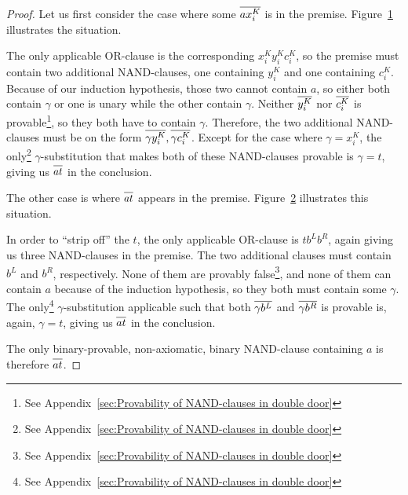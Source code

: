 \begin{proof}
Let us first consider the case where some $\ol{ax^K_i}$ is in the premise.
Figure~\ref{fig:nand_base_case} illustrates the situation.\par
\begin{figure}[!h]
  \centering
  \begin{prooftree*}
    \Hypo{\dots}
    \Hypo{\dots}
  \end{prooftree*}
  \caption{}
  \label{fig:nand_base_case}
\end{figure}
The only applicable OR-clause is the corresponding $x^K_iy^K_ic^K_i$, so the premise must contain two additional NAND-clauses, one containing $y^K_i$ and one containing $c^K_i$.
Because of our induction hypothesis, those two cannot contain $a$, so either both contain $\gamma$ or one is unary while the other contain $\gamma$.
Neither $\ol{y^K_i}$ nor $\ol{c^K_i}$ is provable\footnote{\label{table_reference} See Appendix~\ref{sec:Provability of NAND-clauses in double door}}, so they both have to contain $\gamma$.
Therefore, the two additional NAND-clauses must be on the form $\ol{\gamma y^K_i},\ol{\gamma c^K_i}$.
Except for the case where $\gamma = x^K_i$, the only\footnote{\label{table_reference} See Appendix~\ref{sec:Provability of NAND-clauses in double door}} $\gamma$-substitution that makes both of these NAND-clauses provable is $\gamma = t$, giving us $\ol{at}$ in the conclusion.

The other case is where $\ol{at}$ appears in the premise.
Figure~\ref{fig:nand_inductive_step} illustrates this situation.\par
\begin{figure}[!h]
  \centering
  \begin{prooftree*}
    \Hypo{\dots}
    \Hypo{\dots}
    \Hypo{\dots}
  \end{prooftree*}
  \caption{}
  \label{fig:nand_inductive_step}
\end{figure}
In order to ``strip off'' the $t$, the only applicable OR-clause is $tb^Lb^R$, again giving us three NAND-clauses in the premise.
The two additional clauses must contain $b^L$ and $b^R$, respectively.
None of them are provably false\footnote{\label{table_reference} See Appendix~\ref{sec:Provability of NAND-clauses in double door}}, and none of them can contain $a$ because of the induction hypothesis, so they both must contain some $\gamma$.
The only\footnote{\label{table_reference} See Appendix~\ref{sec:Provability of NAND-clauses in double door}} $\gamma$-substitution applicable such that both $\ol{\gamma b^L}$ and $\ol{\gamma b^R}$ is provable is, again, $\gamma = t$, giving us $\ol{at}$ in the conclusion.

The only binary-provable, non-axiomatic, binary NAND-clause containing $a$ is therefore $\ol{at}$.
\end{proof}

